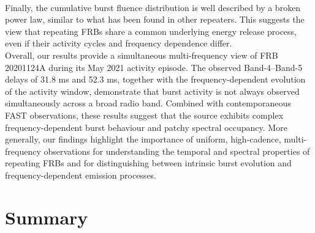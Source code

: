 \documentclass[preprint2, trackchanges]{aastex631}
\begin{document}
\\
Finally, the cumulative burst fluence distribution is well described by a broken power law, similar to what has been found in other repeaters. This suggests the view that repeating FRBs share a common underlying energy release process, even if their activity cycles and frequency dependence differ.
\\
Overall, our results provide a simultaneous multi-frequency view of FRB 20201124A during its May 2021 activity episode. The observed Band-4--Band-5 delays of 31.8 ms and 52.3 ms, together with the frequency-dependent evolution of the activity window, demonstrate that burst activity is not always observed simultaneously across a broad radio band. Combined with contemporaneous FAST observations, these results suggest that the source exhibits complex frequency-dependent burst behaviour and patchy spectral occupancy. More generally, our findings highlight the importance of uniform, high-cadence, multi-frequency observations for understanding the temporal and spectral properties of repeating FRBs and for distinguishing between intrinsic burst evolution and frequency-dependent emission processes.

\section{Summary}
\end{document}
